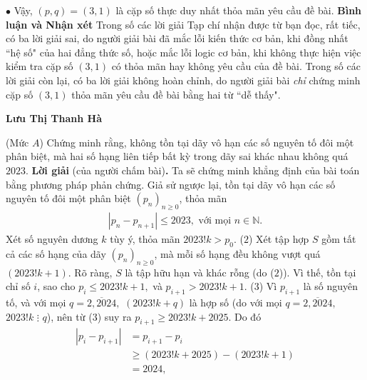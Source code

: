 \begin{multicols}{2}
	\vskip 0.05cm
	$\bullet$ Vậy, $(p, q) = (3, 1)$ là cặp số thực duy nhất thỏa mãn yêu cầu đề bài.
	\vskip 0.05cm
	\textbf{\color{thachthuctoanhoc}Bình luận và Nhận xét}
	\vskip 0.05cm
	Trong số các lời giải Tạp chí nhận được từ bạn đọc, rất tiếc, có ba lời giải sai, do người giải bài đã mắc lỗi kiến thức cơ bản, khi đồng nhất ``hệ số" của hai đẳng thức số, hoặc mắc lỗi logic cơ bản, khi không thực hiện việc kiểm tra cặp số $(3, 1)$ có thỏa mãn hay không yêu cầu của đề bài. Trong số các lời giải còn lại, có ba lời giải không hoàn chỉnh, do người giải bài \textit{chỉ} chứng minh cặp số $(3, 1)$ thỏa mãn yêu cầu đề bài bằng hai từ ``dễ thấy".
	\begin{flushright}
		\textbf{\color{thachthuctoanhoc}Lưu Thị Thanh Hà}
	\end{flushright}
	{}
	(Mức $A$) Chứng minh rằng, không tồn tại dãy vô hạn các số nguyên tố đôi một phân biệt, mà hai số hạng liên tiếp bất kỳ trong dãy sai khác nhau không quá $2023$. 
	\vskip 0.05cm
	\textbf{\color{thachthuctoanhoc}Lời giải} (của người chấm bài)\textbf{\color{thachthuctoanhoc}.}
	\vskip 0.05cm
	Ta sẽ chứng minh khẳng định của bài toán bằng phương pháp phản chứng.
	\vskip 0.05cm
	Giả sử ngược lại, tồn tại dãy vô hạn các số nguyên tố đôi một phân biệt ${\left( {{p_n}} \right)_{n \ge 0}}$, thỏa mãn
	\begin{align*}
		\left| {{p_n} - {p_{n + 1}}} \right| \le 2023, \text{ với mọi } n \in \mathbb{N}. \tag{$1$}
	\end{align*}
	Xét số nguyên dương $k$ tùy ý, thỏa mãn $2023!k > {p_0}.$ \hfill ($2$)
	\vskip 0.05cm
	Xét tập hợp $S$ gồm tất cả các số hạng của dãy ${\left( {{p_n}} \right)_{n \ge 0}}$, mà mỗi số hạng đều không vượt quá $(2023!k + 1)$.
	\vskip 0.05cm
	Rõ ràng, $S$ là tập hữu hạn và khác rỗng (do ($2$)). Vì thế, tồn tại chỉ số $i$, sao cho  \linebreak ${p_i} \le 2023!k + 1,$ và ${p_{i + 1}} > 2023!k + 1.$ \hfill ($3$)
	\vskip 0.05cm
	Vì  ${p_{i + 1}}$ là số nguyên tố, và với mọi $q = \overline {2,2024} ,$  $(2023!k + q)$ là hợp số (do với mọi $q = \overline {2,2024} ,$  $2023!k \,\,\vdots \,\,q$), nên từ ($3$) suy ra ${p_{i + 1}} \ge 2023!k + 2025.$  Do đó
	\begin{align*}
		\left| {{p_i} \!-\! {p_{i \!+\! 1}}} \right| &= {p_{i + 1}} \!-\! {p_i} \\
		&\ge \left( {2023!k \!+\! 2025} \right) \!-\! \left( {2023!k \!+\! 1\!} \right)\\
		&= 2024,
	\end{align*}

\end{multicols}
